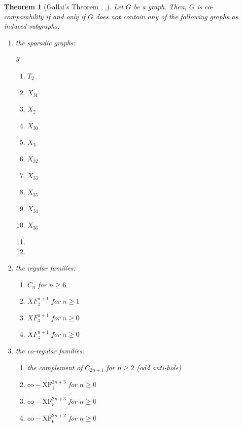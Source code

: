 \documentclass[12pt,a4paper]{amsart}
\theoremstyle{plain}
\newtheorem{thrm}{Theorem}[section]
\def\bthm{\begin{thrm}}
\def\ethm{\end{thrm}}
\theoremstyle{definition}
\theoremstyle{remark}
\begin{document}
\bthm[{Gallai's Theorem \cite{gallai1967transitiv}, \cite[Theorem 2.1]{trotter1992combinatorics}},\cite{isgci}]
\label{thm:gallai}
Let $G$ be a graph. Then, $G$ is co-comparability if and only if $G$ does not contain any of the following graphs as induced subgraphs:
\begin{enumerate}
    \item the sporadic graphs: 
        \begin{multicols}{3}
            \begin{enumerate}
                \item $T_{2}$
                \item $X_{31}$
                \item $X_{2}$
                \item $X_{30}$
                \item $X_{3}$
                \item $X_{32}$
                \item $X_{33}$
                \item $X_{35}$
                \item $X_{34}$
                \item $X_{36}$
                \item[] 
                \item[]
            \end{enumerate}
        \end{multicols}
    \item the regular families:
        \begin{enumerate}
            \item $C_{n}$ for $n\geq 6$
            \item $XF_{2}^{n+1}$ for $n \geq 1$
            \item $XF_{3}^{n+1}$ for $n \geq 0$ 
            \item $XF_{4}^{n+1}$ for $n \geq 0$\\
        \end{enumerate}
    \item the co-regular families:
        \begin{enumerate}
            \item the complement of $C_{2n+1}$ for $n \geq 2$ (odd anti-hole)
            \item $\mathrm{co\!-\!XF}_{1}^{2n+3}$ for $n \geq 0$ 
            \item $\mathrm{co\!-\!XF}_{5}^{2n+3}$ for $n \geq 0$
            \item $\mathrm{co\!-\!XF}_{6}^{2n+2}$ for $n \geq 0$ 
        \end{enumerate}
\end{enumerate}
\ethm
\end{document}
